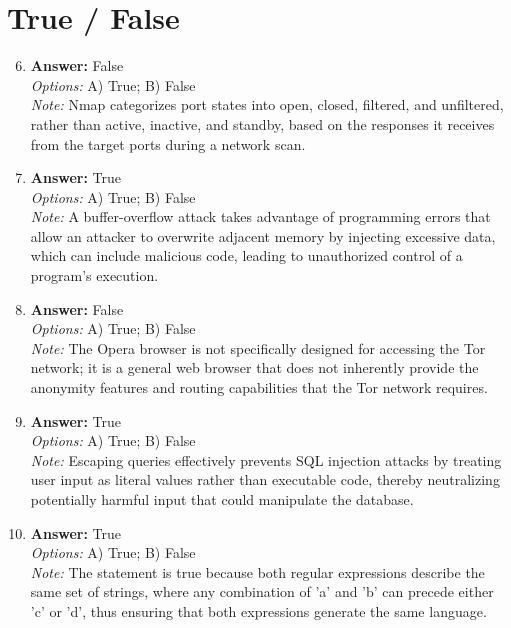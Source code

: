 \documentclass[12pt]{article}
\begin{document}
\section*{True / False}
\begin{enumerate}[label=\arabic*.]
\setcounter{enumi}{5}
\item \textbf{Answer:} False
\\ \textit{Options:} A) True; B) False
\\ \textit{Note:} Nmap categorizes port states into open, closed, filtered, and unfiltered, rather than active, inactive, and standby, based on the responses it receives from the target ports during a network scan.
\item \textbf{Answer:} True
\\ \textit{Options:} A) True; B) False
\\ \textit{Note:} A buffer-overflow attack takes advantage of programming errors that allow an attacker to overwrite adjacent memory by injecting excessive data, which can include malicious code, leading to unauthorized control of a program's execution.
\item \textbf{Answer:} False
\\ \textit{Options:} A) True; B) False
\\ \textit{Note:} The Opera browser is not specifically designed for accessing the Tor network; it is a general web browser that does not inherently provide the anonymity features and routing capabilities that the Tor network requires.
\item \textbf{Answer:} True
\\ \textit{Options:} A) True; B) False
\\ \textit{Note:} Escaping queries effectively prevents SQL injection attacks by treating user input as literal values rather than executable code, thereby neutralizing potentially harmful input that could manipulate the database.
\item \textbf{Answer:} True
\\ \textit{Options:} A) True; B) False
\\ \textit{Note:} The statement is true because both regular expressions describe the same set of strings, where any combination of 'a' and 'b' can precede either 'c' or 'd', thus ensuring that both expressions generate the same language.
\end{enumerate}
\end{document}
